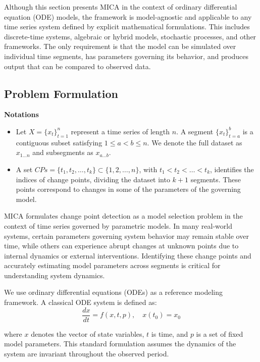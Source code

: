 \documentclass[10pt,letterpaper]{article}
\begin{document}
Although this section presents MICA in the context of ordinary differential equation (ODE) models, the framework is model-agnostic and applicable to any time series system defined by explicit mathematical formulations. This includes discrete-time systems, algebraic or hybrid models, stochastic processes, and other frameworks. The only requirement is that the model can be simulated over individual time segments, has parameters governing its behavior, and produces output that can be compared to observed data.

\subsection*{Problem Formulation}

\vspace{0.5em}
\textbf{Notations}
\begin{itemize}
  \item Let \( X = \{x_t\}_{t=1}^n \) represent a time series of length \( n \). A segment \( \{x_t\}_{t=a}^b \) is a contiguous subset satisfying \( 1 \leq a < b \leq n \). We denote the full dataset as \( x_{1...n} \) and subsegments as \( x_{a...b} \).
  
  \item A set \( CPs = \{ t_1, t_2, \dots, t_k \} \subset \{1, 2, \dots, n\} \), with \( t_1 < t_2 < \dots < t_k \), identifies the indices of change points, dividing the dataset into \( k+1 \) segments. These points correspond to changes in some of the parameters of the governing model.
\end{itemize}

MICA formulates change point detection as a model selection problem in the context of time series governed by parametric models. In many real-world systems, certain parameters governing system behavior may remain stable over time, while others can experience abrupt changes at unknown points due to internal dynamics or external interventions. Identifying these change points and accurately estimating model parameters across segments is critical for understanding system dynamics.

We use ordinary differential equations (ODEs) as a reference modeling framework. A classical ODE system is defined as:
\begin{equation}
   \frac{dx}{dt} = f(x, t, p), \quad x(t_0) = x_0
\end{equation}

where \( x \) denotes the vector of state variables, \(t \) is time, and \( p \) is a set of fixed model parameters. This standard formulation assumes the dynamics of the system are invariant throughout the observed period.
\end{document}
